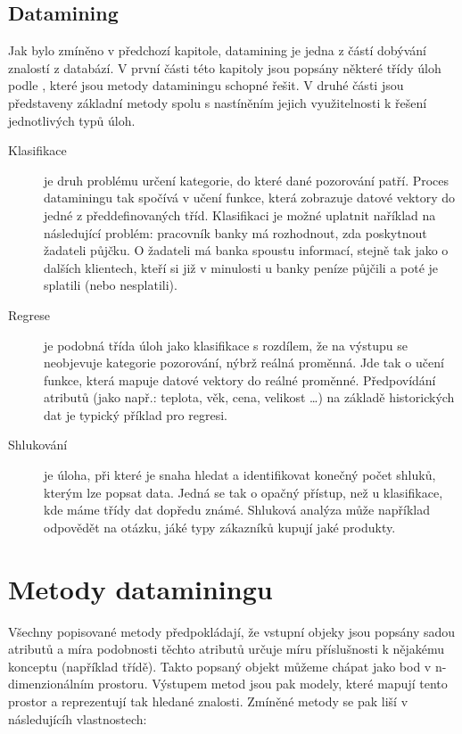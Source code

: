 \documentclass[thesis=M,czech]{FITthesis}[2012/06/26]
\begin{document}
\subsection{Datamining}
Jak bylo zmíněno v předchozí kapitole, datamining je jedna z částí dobývání znalostí z databází. V první části této kapitoly jsou popsány některé třídy úloh podle \cite{fayyad}, které jsou metody dataminingu schopné řešit. V druhé části jsou představeny základní metody spolu s nastíněním jejich využitelnosti k řešení jednotlivých typů úloh. 

\begin{description}
    \item[Klasifikace]
    
    je druh problému určení kategorie, do které dané pozorování patří. Proces dataminingu tak spočívá v učení funkce, která zobrazuje datové vektory do jedné z předdefinovaných tříd. Klasifikaci je možné uplatnit naříklad na následující problém: pracovník 
    banky má rozhodnout, zda poskytnout žadateli půjčku. O žadateli má banka spoustu informací, stejně tak jako o dalších klientech, kteří si již v minulosti u banky peníze půjčili a poté je splatili (nebo nesplatili).
    
    
    \item[Regrese]
    
    je podobná třída úloh jako klasifikace s rozdílem, že na výstupu se neobjevuje kategorie pozorování, nýbrž reálná proměnná. Jde tak o učení funkce, která mapuje datové vektory do reálné proměnné. Předpovídání atributů (jako např.: teplota, věk, cena, velikost \dots) na základě historických dat je typický příklad pro regresi.
    

   \item[Shlukování]
   
   je úloha, při které je snaha hledat a identifikovat konečný počet shluků, kterým lze popsat data. Jedná se tak o opačný přístup, než u klasifikace, kde máme třídy dat dopředu známé. Shluková analýza může například odpovědět na otázku, jáké typy zákazníků kupují jaké produkty.
   
\end{description}


 \section{Metody dataminingu}
Všechny popisované metody předpokládají, že vstupní objeky jsou popsány sadou atributů a míra podobnosti těchto atributů určuje míru příslušnosti k nějakému konceptu (například třídě). Takto popsaný objekt můžeme chápat jako bod v n-dimenzionálním prostoru. Výstupem metod jsou pak modely, které mapují tento prostor a reprezentují tak hledané znalosti.
Zmíněné metody se pak liší v následujícíh vlastnostech:
\end{document}
